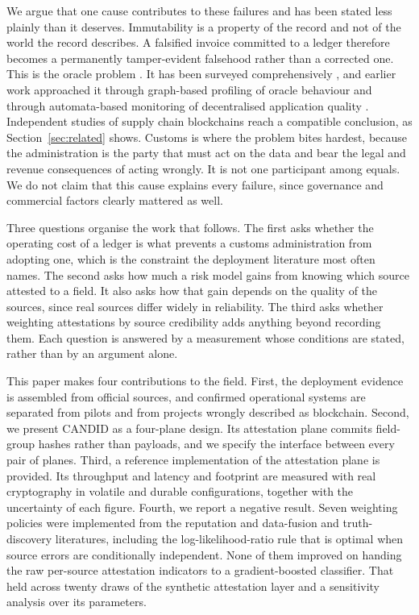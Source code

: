 \documentclass[information,article,submit,moreauthors]{Definitions/mdpi}
\begin{document}
We argue that one cause contributes to these failures and has been stated less plainly than it deserves. Immutability is a property of the record and not of the world the record describes. A falsified invoice committed to a ledger therefore becomes a permanently tamper-evident falsehood rather than a corrected one. This is the oracle problem \cite{caldarelli2020oracle,albreiki2020oracles}. It has been surveyed comprehensively \cite{pasdar2023oraclesurvey}, and earlier work approached it through graph-based profiling of oracle behaviour \cite{almiani2023oracles} and through automata-based monitoring of decentralised application quality \cite{alrawashdeh2024dfa}. Independent studies of supply chain blockchains reach a compatible conclusion, as Section~\ref{sec:related} shows. Customs is where the problem bites hardest, because the administration is the party that must act on the data and bear the legal and revenue consequences of acting wrongly. It is not one participant among equals. We do not claim that this cause explains every failure, since governance and commercial factors clearly mattered as well.

Three questions organise the work that follows. The first asks whether the operating cost of a ledger is what prevents a customs administration from adopting one, which is the constraint the deployment literature most often names. The second asks how much a risk model gains from knowing which source attested to a field. It also asks how that gain depends on the quality of the sources, since real sources differ widely in reliability. The third asks whether weighting attestations by source credibility adds anything beyond recording them. Each question is answered by a measurement whose conditions are stated, rather than by an argument alone.

This paper makes four contributions to the field. First, the deployment evidence is assembled from official sources, and confirmed operational systems are separated from pilots and from projects wrongly described as blockchain. Second, we present CANDID as a four-plane design. Its attestation plane commits field-group hashes rather than payloads, and we specify the interface between every pair of planes. Third, a reference implementation of the attestation plane is provided. Its throughput and latency and footprint are measured with real cryptography in volatile and durable configurations, together with the uncertainty of each figure. Fourth, we report a negative result. Seven weighting policies were implemented from the reputation and data-fusion and truth-discovery literatures, including the log-likelihood-ratio rule that is optimal when source errors are conditionally independent. None of them improved on handing the raw per-source attestation indicators to a gradient-boosted classifier. That held across twenty draws of the synthetic attestation layer and a sensitivity analysis over its parameters.
\end{document}

